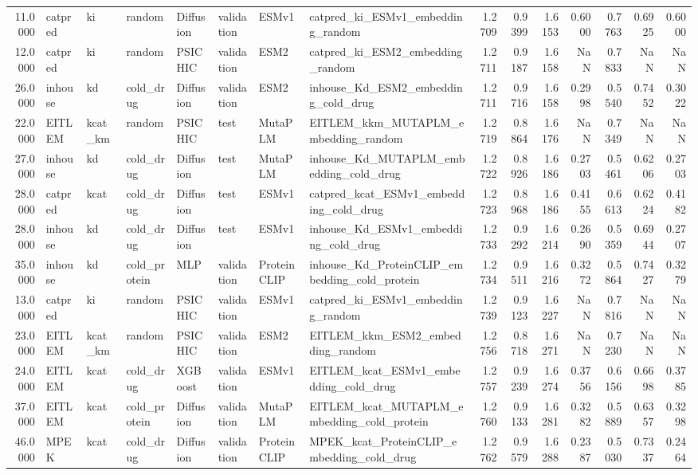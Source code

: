 \begin{tabular}{rlllllllrrrrrrr}
11.0000 & catpred & ki & random & Diffusion & validation & ESMv1 & catpred_ki_ESMv1_embedding_random & 1.2709 & 0.9399 & 1.6153 & 0.6000 & 0.7763 & 0.6925 & 0.6000 \\
12.0000 & catpred & ki & random & PSICHIC & validation & ESM2 & catpred_ki_ESM2_embedding_random & 1.2711 & 0.9187 & 1.6158 & NaN & 0.7833 & NaN & NaN \\
26.0000 & inhouse & kd & cold_drug & Diffusion & validation & ESM2 & inhouse_Kd_ESM2_embedding_cold_drug & 1.2711 & 0.9716 & 1.6158 & 0.2998 & 0.5540 & 0.7452 & 0.3022 \\
22.0000 & EITLEM & kcat_km & random & PSICHIC & test & MutaPLM & EITLEM_kkm_MUTAPLM_embedding_random & 1.2719 & 0.8864 & 1.6176 & NaN & 0.7349 & NaN & NaN \\
27.0000 & inhouse & kd & cold_drug & Diffusion & test & MutaPLM & inhouse_Kd_MUTAPLM_embedding_cold_drug & 1.2722 & 0.8926 & 1.6186 & 0.2703 & 0.5461 & 0.6206 & 0.2703 \\
28.0000 & catpred & kcat & cold_drug & Diffusion & test & ESMv1 & catpred_kcat_ESMv1_embedding_cold_drug & 1.2723 & 0.8968 & 1.6186 & 0.4155 & 0.6613 & 0.6224 & 0.4182 \\
28.0000 & inhouse & kd & cold_drug & Diffusion & test & ESMv1 & inhouse_Kd_ESMv1_embedding_cold_drug & 1.2733 & 0.9292 & 1.6214 & 0.2690 & 0.5359 & 0.6944 & 0.2707 \\
35.0000 & inhouse & kd & cold_protein & MLP & validation & ProteinCLIP & inhouse_Kd_ProteinCLIP_embedding_cold_protein & 1.2734 & 0.9511 & 1.6216 & 0.3272 & 0.5864 & 0.7427 & 0.3279 \\
13.0000 & catpred & ki & random & PSICHIC & validation & ESMv1 & catpred_ki_ESMv1_embedding_random & 1.2739 & 0.9123 & 1.6227 & NaN & 0.7816 & NaN & NaN \\
23.0000 & EITLEM & kcat_km & random & PSICHIC & validation & ESM2 & EITLEM_kkm_ESM2_embedding_random & 1.2756 & 0.8718 & 1.6271 & NaN & 0.7230 & NaN & NaN \\
24.0000 & EITLEM & kcat & cold_drug & XGBoost & validation & ESMv1 & EITLEM_kcat_ESMv1_embedding_cold_drug & 1.2757 & 0.9239 & 1.6274 & 0.3756 & 0.6156 & 0.6698 & 0.3785 \\
37.0000 & EITLEM & kcat & cold_protein & Diffusion & validation & MutaPLM & EITLEM_kcat_MUTAPLM_embedding_cold_protein & 1.2760 & 0.9133 & 1.6281 & 0.3282 & 0.5889 & 0.6357 & 0.3298 \\
46.0000 & MPEK & kcat & cold_drug & Diffusion & validation & ProteinCLIP & MPEK_kcat_ProteinCLIP_embedding_cold_drug & 1.2762 & 0.9579 & 1.6288 & 0.2387 & 0.5030 & 0.7337 & 0.2464 \\

\end{tabular}
